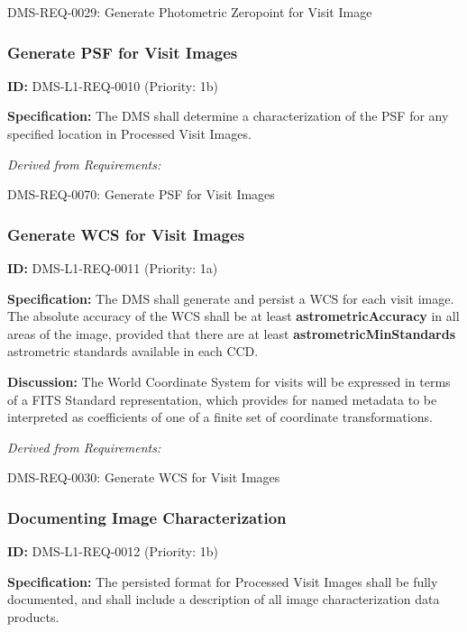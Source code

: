 \documentclass[SE,toc,lsstdraft]{lsstdoc}
\begin{document}
DMS-REQ-0029:
Generate Photometric Zeropoint for Visit Image \newline

\subsubsection{Generate PSF for Visit Images}

\label{DMS-L1-REQ-0010}
\textbf{ID:} DMS-L1-REQ-0010 (Priority: 1b)

\textbf{Specification:} The DMS shall determine a characterization of the PSF for any specified location in Processed Visit Images.

\emph{Derived from Requirements:}

DMS-REQ-0070:
Generate PSF for Visit Images \newline

\subsubsection{Generate WCS for Visit Images}

\label{DMS-L1-REQ-0011}
\textbf{ID:} DMS-L1-REQ-0011 (Priority: 1a)

\textbf{Specification:} The DMS shall generate and persist a WCS for each visit image.  The absolute accuracy of the WCS shall be at least \textbf{astrometricAccuracy} in all areas of the image, provided that there are at least \textbf{astrometricMinStandards} astrometric standards available in each CCD.

\textbf{Discussion:} The World Coordinate System for visits will be expressed in terms of a FITS Standard representation, which provides for named metadata to be interpreted as coefficients of one of a finite set of coordinate transformations.

\emph{Derived from Requirements:}

DMS-REQ-0030:
Generate WCS for Visit Images \newline

\subsubsection{Documenting Image Characterization}

\label{DMS-L1-REQ-0012}
\textbf{ID:} DMS-L1-REQ-0012 (Priority: 1b)

\textbf{Specification:} The persisted format for Processed Visit Images shall be fully documented, and shall include a description of all image characterization data products.
\end{document}
